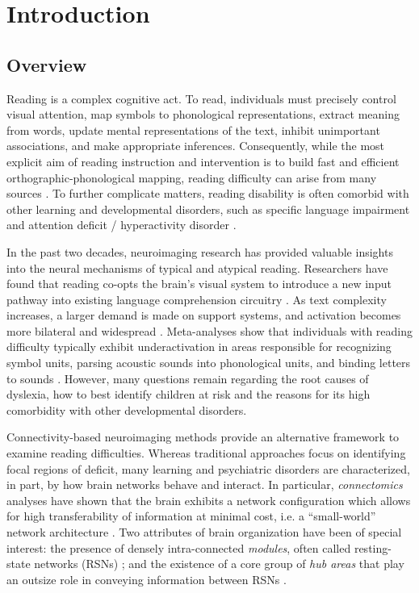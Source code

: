 \chapter{Introduction}

\section{Overview}
Reading is a complex cognitive act. To read, individuals must precisely control visual attention, map symbols to phonological representations, extract meaning from words, update mental representations of the text, inhibit unimportant associations, and make appropriate inferences. Consequently, while the most explicit aim of reading instruction and intervention is to build fast and efficient orthographic-phonological mapping, reading difficulty can arise from many sources \cite{Pennington2009, vanderLely2010}. To further complicate matters, reading disability is often comorbid with other learning and developmental disorders, such as specific language impairment and attention deficit / hyperactivity disorder \cite{Pennington2006, Margari2013}.

In the past two decades, neuroimaging research has provided valuable insights into the neural mechanisms of typical and atypical reading. Researchers have found that reading co-opts the brain's visual system to introduce a new input pathway into existing language comprehension circuitry \cite{Jobard2007}. As text complexity increases, a larger demand is made on support systems, and activation becomes more bilateral and widespread \cite{Xu2005}.  Meta-analyses show that individuals with reading difficulty typically exhibit underactivation in areas responsible for recognizing symbol units, parsing acoustic sounds into phonological units, and binding letters to sounds \cite{Maisog2008, Richlan2009, Paulesu2014}. However, many questions remain regarding the root causes of dyslexia, how to best identify children at risk and the reasons for its high comorbidity with other developmental disorders. 

Connectivity-based neuroimaging methods provide an alternative framework to examine reading difficulties. Whereas traditional approaches focus on identifying focal regions of deficit, many learning and psychiatric disorders are characterized, in part, by how brain networks behave and interact. In particular, \textit{connectomics} analyses have shown that the brain exhibits a network configuration which allows for high transferability of information at minimal cost, i.e. a “small-world” network architecture \cite{Bullmore2012}. Two attributes of brain organization have been of special interest: the presence of densely intra-connected \textit{modules}, often called resting-state networks (RSNs) \cite{Sporns2016}; and the existence of a core group of \textit{hub areas} that play an outsize role in conveying information between RSNs \cite{VandenHeuvel2011}. 

